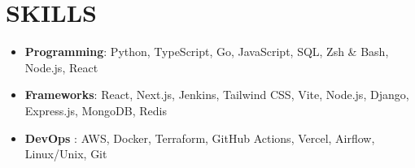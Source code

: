 \documentclass{resume}
\begin{document}







\section[SKILLS]{SKILLS}

\begin{itemize}
\item \textbf{Programming}: Python, TypeScript, Go, JavaScript, SQL, Zsh \& Bash, Node.js, React
\item \textbf{Frameworks}: React, Next.js, Jenkins, Tailwind CSS, Vite, Node.js, Django, Express.js, MongoDB, Redis
\item \textbf{DevOps }: AWS, Docker, Terraform, GitHub Actions, Vercel, Airflow, Linux/Unix, Git

\end{itemize}





\renewcommand\thefootnote{}
\addtocounter{footnote}{-1}
\renewcommand\thefootnote{\arabic{footnote}} %
 
\end{document}
